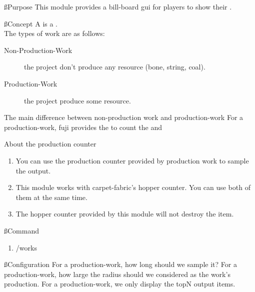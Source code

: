 
\ss{Purpose}
This module provides a bill-board gui for players to show their .

\ss{Concept}
A  is a . \\
The types of work are as follows:
\begin{description}
    \item [Non-Production-Work] the project don't produce any resource (\eg bone, string, coal).
    \item[Production-Work] the project produce some resource.
\end{description}

\begin{note}{The main difference between non-production work and production-work}
    For a production-work, fuji provides the  to count the  and 
\end{note}

\begin{tips}{About the production counter}
    \begin{enumerate}
        \item You can use the production counter provided by production work to sample the output.
        \item {This module works with carpet-fabric's hopper counter. You can use both of them at the same time.}
        \item The hopper counter provided by this module will not destroy the item.
    \end{enumerate}

\end{tips}

\ss{Command}
\begin{enumerate}
    \item /works
\end{enumerate}

\ss{Configuration}
For a production-work, how long should we sample it?
For a production-work, how large the radius should we considered as the work's production.
For a production-work, we only display the topN output items.








